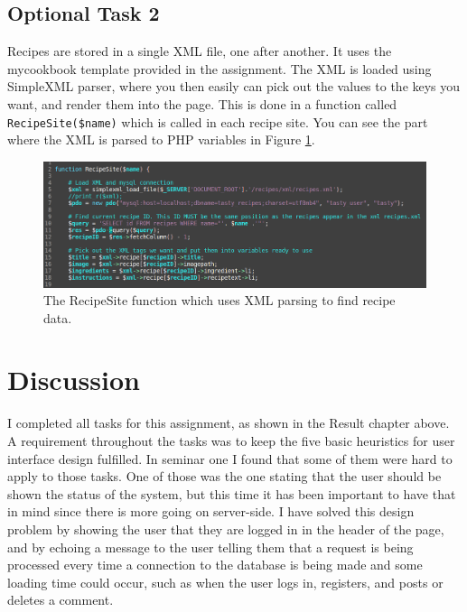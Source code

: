 \documentclass[a4paper]{scrreprt}
\newcommand{\code}[1]{\texttt{#1}}
\begin{document}
\section{Optional Task 2}

Recipes are stored in a single XML file, one after another. It uses the mycookbook template provided in the assignment. The XML is loaded using SimpleXML parser, where you then easily can pick out the values to the keys you want, and render them into the page. This is done in a function called \code{RecipeSite(\$name)} which is called in each recipe site. You can see the part where the XML is parsed to PHP variables in Figure \ref{fig:recipesite}.

\begin{figure}[h!]
  \begin{center}
    \includegraphics[scale=0.41]{img/recipesite.png}
    \caption{The RecipeSite function which uses XML parsing to find recipe data.}
    \label{fig:recipesite}
  \end{center}
\end{figure}

\chapter{Discussion}

I completed all tasks for this assignment, as shown in the Result chapter above. A requirement throughout the tasks was to keep the five basic heuristics for user interface design fulfilled. In seminar one I found that some of them were hard to apply to those tasks. One of those was the one stating that the user should be shown the status of the system, but this time it has been important to have that in mind since there is more going on server-side. I have solved this design problem by showing the user that they are logged in in the header of the page, and by echoing a message to the user telling them that a request is being processed every time a connection to the database is being made and some loading time could occur, such as when the user logs in, registers, and posts or deletes a comment.
\end{document}

